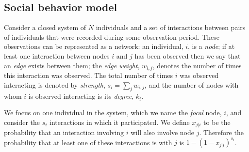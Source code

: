 \documentclass[twocolumn,8pt]{article}
\begin{document}
\subsection*{Social behavior model}
\label{social_behavior}
Consider a closed system of $N$ individuals and a set of interactions between pairs of individuals that were recorded during some observation period. These observations can be represented as a network: an individual, $i$, is a \emph{node}; if at least one interaction between nodes $i$ and $j$ has been observed then we say that an \emph{edge} exists between them; the \emph{edge weight}, $w_{i,j}$, denotes the number of times this interaction was observed. The total number of times $i$ was observed interacting is denoted by \emph{strength}, $s_{i}=\sum_{j}w_{i,j}$, and the number of nodes with whom $i$ is observed interacting is its \emph{degree}, $k_{i}$.

We focus on one individual in the system, which we name the \emph{focal} node, $i$, and consider the $s_{i}$ interactions in which it participated. We define $x_{j|i}$ to be the probability that an interaction involving $i$ will also involve node $j$. Therefore the probability that at least one of these interactions is with $j$ is $1-(1-x_{j|i})^{s_{i}}$.
\end{document}

